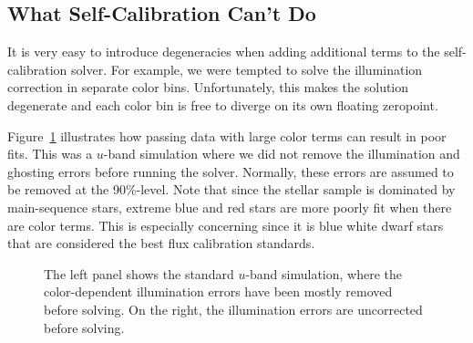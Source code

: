 \documentclass[12pt,preprint]{aastex}
\begin{document}
\subsection{What Self-Calibration Can't Do}

It is very easy to introduce degeneracies when adding additional terms to the self-calibration solver.  For example, we were tempted to solve the illumination correction in separate color bins.  Unfortunately, this makes the solution degenerate and each color bin is free to diverge on its own floating zeropoint.  

Figure~\ref{fig:badcolor} illustrates how passing data with large color terms can result in poor fits.  This was a $u$-band simulation where we did not remove the illumination and ghosting errors before running the solver.  Normally, these errors are assumed to be removed at the 90\%-level.  Note that since the stellar sample is dominated by main-sequence stars, extreme blue and red stars are more poorly fit when there are color terms.  This is especially concerning since it is blue white dwarf stars that are considered the best flux calibration standards.

\begin{figure}
\caption{The left panel shows the standard $u$-band simulation, where the color-dependent illumination errors have been mostly removed before solving.  On the right,  the illumination errors are uncorrected before solving.  \label{fig:badcolor}}
\end{figure}
\end{document}
